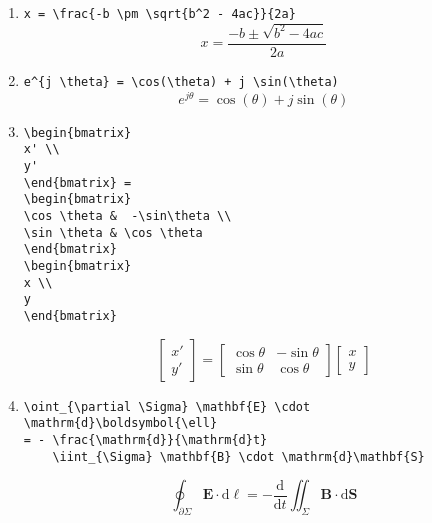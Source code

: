 \begin{enumerate}
\item \verb|x = \frac{-b \pm \sqrt{b^2 - 4ac}}{2a}|
    \[x = \frac{-b \pm \sqrt{b^2 - 4 a c}}{2a} \]

\item \verb|e^{j \theta} = \cos(\theta) + j \sin(\theta)|
    \[e^{j \theta} = \cos(\theta) + j \sin(\theta)\]

\item
\begin{verbatim}
\begin{bmatrix}
x' \\
y'
\end{bmatrix} =
\begin{bmatrix}
\cos \theta &  -\sin\theta \\
\sin \theta & \cos \theta
\end{bmatrix}
\begin{bmatrix}
x \\
y
\end{bmatrix}
\end{verbatim}
\[
\begin{bmatrix}
x' \\
y'
\end{bmatrix} =
\begin{bmatrix}
\cos \theta &  -\sin\theta \\
\sin \theta & \cos \theta
\end{bmatrix}
\begin{bmatrix}
x \\
y
\end{bmatrix}
\]

\item
\begin{verbatim}
\oint_{\partial \Sigma} \mathbf{E} \cdot
\mathrm{d}\boldsymbol{\ell}
= - \frac{\mathrm{d}}{\mathrm{d}t}
    \iint_{\Sigma} \mathbf{B} \cdot \mathrm{d}\mathbf{S}
\end{verbatim}
    \[\oint_{\partial \Sigma} \mathbf{E} \cdot \mathrm{d}\boldsymbol{\ell}  = - \frac{\mathrm{d}}{\mathrm{d}t} \iint_{\Sigma} \mathbf{B} \cdot \mathrm{d}\mathbf{S}\]
\end{enumerate}
